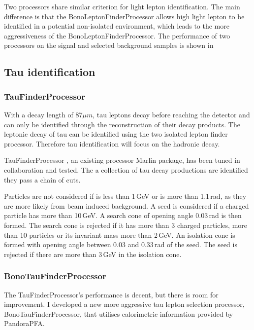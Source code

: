 Two processors share similar criterion for light lepton identification. The main difference is that the BonoLeptonFinderProcessor allows high \pT light lepton to be identified in a potential non-isolated environment, which leads to the more aggressiveness of the BonoLeptonFinderProcessor. The performance of two processors on the signal and selected background samples is shown in 

\subsection{Tau identification}

\subsubsection{TauFinderProcessor}

With a decay length of 87$\mu{m}$, tau leptons decay before reaching the detector and can only be identified through the reconstruction of their decay products. The leptonic decay of tau can be identified using the two isolated lepton finder processor. Therefore tau identification will focus on the hadronic decay.

TauFinderProcessor \cite{LCD-Note-2010-009}, an existing processor Marlin package, has been tuned in collaboration and tested. The a collection of tau decay productions are identified they pass a chain of cuts.

Particles are not considered if \pT is less than 1\,GeV or \absCosTheta is more than 1.1\,rad, as they are more likely from beam induced background. A seed is considered if a charged particle has \pT more than 10\,GeV. A search cone of opening angle 0.03\,rad is then formed. The search cone is rejected if it has more than 3 charged particles, more than 10 particles or its invariant mass more than 2\,GeV. An isolation cone is formed with opening angle between 0.03 and 0.33\,rad of the seed. The seed is rejected if there are more than 3\,GeV in the isolation cone.

\subsubsection{BonoTauFinderProcessor}

The TauFinderProcessor's performance is decent, but there is room for improvement. I developed a new more aggressive tau lepton selection processor, BonoTauFinderProcessor, that utilises calorimetric information provided by PandoraPFA.

